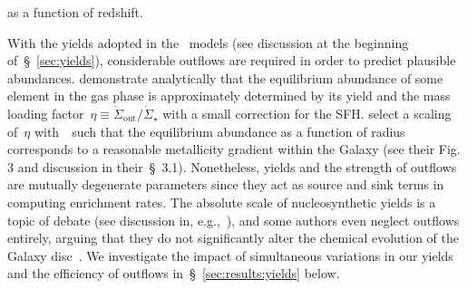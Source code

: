 \documentclass[ms.tex]{subfiles}
\begin{document}
as a function of redshift.
\par
With the yields adopted in the~\citet{Johnson2021} models (see discussion at
the beginning of~\S~\ref{sec:yields}), considerable outflows are required in
order to predict plausible abundances.
\citet{Weinberg2017} demonstrate analytically that the equilibrium abundance of
some element in the gas phase is approximately determined by its yield and the
mass loading factor~$\eta \equiv \dot{\Sigma}_\text{out} / \dot{\Sigma}_\star$
with a small correction for the SFH.
\citet{Johnson2021} select a scaling of~$\eta$ with~\rgal~such that the
equilibrium abundance as a function of radius corresponds to a reasonable
metallicity gradient within the Galaxy (see their Fig. 3 and discussion in
their~\S~3.1).
Nonetheless, yields and the strength of outflows are mutually degenerate
parameters since they act as source and sink terms in computing enrichment
rates.
The absolute scale of nucleosynthetic yields is a topic of debate (see
discussion in, e.g.,~\citealp{Griffith2021a}), and some authors even neglect
outflows entirely, arguing that they do not significantly alter the chemical
evolution of the Galaxy disc~\citep[e.g.][]{Spitoni2019, Spitoni2021}.
We investigate the impact of simultaneous variations in our yields and the
efficiency of outflows in~\S~\ref{sec:results:yields} below.
\end{document}
